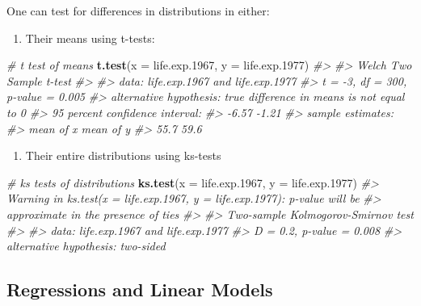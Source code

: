 \documentclass[]{book}
\newenvironment{Shaded}{\begin{snugshade}}{\end{snugshade}}
\newcommand{\KeywordTok}[1]{\textcolor[rgb]{0.13,0.29,0.53}{\textbf{#1}}}
\newcommand{\DataTypeTok}[1]{\textcolor[rgb]{0.13,0.29,0.53}{#1}}
\newcommand{\DecValTok}[1]{\textcolor[rgb]{0.00,0.00,0.81}{#1}}
\newcommand{\CommentTok}[1]{\textcolor[rgb]{0.56,0.35,0.01}{\textit{#1}}}
\newcommand{\NormalTok}[1]{#1}
\providecommand{\tightlist}{%
  \setlength{\itemsep}{0pt}\setlength{\parskip}{0pt}}
\begin{document}
One can test for differences in distributions in either:

\begin{enumerate}
\def\labelenumi{\arabic{enumi})}
\tightlist
\item
  Their means using t-tests:
\end{enumerate}

\begin{Shaded}
\begin{Highlighting}[]
\CommentTok{# t test of means}
\KeywordTok{t.test}\NormalTok{(}\DataTypeTok{x =}\NormalTok{ life.exp.}\DecValTok{1967}\NormalTok{, }\DataTypeTok{y =}\NormalTok{ life.exp.}\DecValTok{1977}\NormalTok{)}
\CommentTok{#> }
\CommentTok{#>  Welch Two Sample t-test}
\CommentTok{#> }
\CommentTok{#> data:  life.exp.1967 and life.exp.1977}
\CommentTok{#> t = -3, df = 300, p-value = 0.005}
\CommentTok{#> alternative hypothesis: true difference in means is not equal to 0}
\CommentTok{#> 95 percent confidence interval:}
\CommentTok{#>  -6.57 -1.21}
\CommentTok{#> sample estimates:}
\CommentTok{#> mean of x mean of y }
\CommentTok{#>      55.7      59.6}
\end{Highlighting}
\end{Shaded}

\begin{enumerate}
\def\labelenumi{\arabic{enumi})}
\setcounter{enumi}{1}
\tightlist
\item
  Their entire distributions using ks-tests
\end{enumerate}

\begin{Shaded}
\begin{Highlighting}[]
\CommentTok{# ks tests of distributions}
\KeywordTok{ks.test}\NormalTok{(}\DataTypeTok{x =}\NormalTok{ life.exp.}\DecValTok{1967}\NormalTok{, }\DataTypeTok{y =}\NormalTok{ life.exp.}\DecValTok{1977}\NormalTok{)}
\CommentTok{#> Warning in ks.test(x = life.exp.1967, y = life.exp.1977): p-value will be}
\CommentTok{#> approximate in the presence of ties}
\CommentTok{#> }
\CommentTok{#>  Two-sample Kolmogorov-Smirnov test}
\CommentTok{#> }
\CommentTok{#> data:  life.exp.1967 and life.exp.1977}
\CommentTok{#> D = 0.2, p-value = 0.008}
\CommentTok{#> alternative hypothesis: two-sided}
\end{Highlighting}
\end{Shaded}

\subsection{Regressions and Linear
Models}\label{regressions-and-linear-models}
\end{document}
